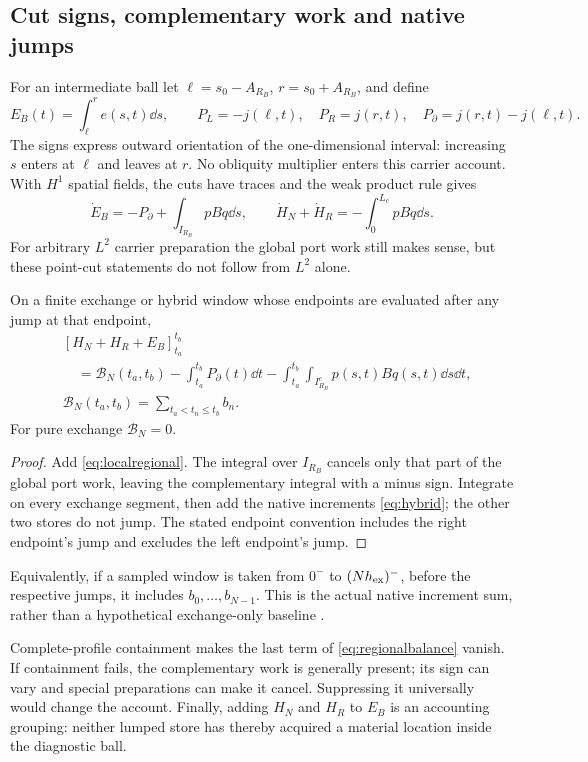 \subsection{Cut signs, complementary work and native jumps}\label{sec:regional}
For an intermediate ball let $\ell=s_0-A_{R_B}$, $r=s_0+A_{R_B}$, and define
\begin{equation}\label{eq:regionaldefinitions}
 E_B(t)=\int_\ell^r e(s,t)\dd s,\qquad
 P_L=-j(\ell,t),\quad P_R=j(r,t),\quad P_\partial=j(r,t)-j(\ell,t).
\end{equation}
The signs express outward orientation of the one-dimensional interval: increasing $s$ enters at $\ell$ and leaves at $r$. No obliquity multiplier enters this carrier account. With $H^1$ spatial fields, the cuts have traces and the weak product rule gives
\begin{equation}\label{eq:localregional}
 \dot E_B=-P_\partial+\int_{I_{R_B}}pBq\dd s,\qquad
 \dot H_N+\dot H_R=-\int_0^{L_c}pBq\dd s.
\end{equation}
For arbitrary $L^2$ carrier preparation the global port work still makes sense, but these point-cut statements do not follow from $L^2$ alone.

\begin{proposition}\label{prop:regional}
On a finite exchange or hybrid window whose endpoints are evaluated after any jump at that endpoint,
\begin{equation}\label{eq:regionalbalance}
 \begin{aligned}
 &[H_N+H_R+E_B]_{t_a}^{t_b}\\
 &\quad=\mathcal B_N(t_a,t_b)
 -\int_{t_a}^{t_b}P_\partial(t)\dd t
 -\int_{t_a}^{t_b}\int_{I_{R_B}^{c}}p(s,t)Bq(s,t)\dd s\dd t,\\
 &\mathcal B_N(t_a,t_b)=\sum_{t_a<t_n\le t_b}b_n.
 \end{aligned}
\end{equation}
For pure exchange $\mathcal B_N=0$.
\end{proposition}
\begin{proof}
Add \eqref{eq:localregional}. The integral over $I_{R_B}$ cancels only that part of the global port work, leaving the complementary integral with a minus sign. Integrate on every exchange segment, then add the native increments \eqref{eq:hybrid}; the other two stores do not jump. The stated endpoint convention includes the right endpoint's jump and excludes the left endpoint's jump.
\end{proof}

Equivalently, if a sampled window is taken from $0^-$ to $(Nh_{\rm ex})^-$, before the respective jumps, it includes $b_0,\ldots,b_{N-1}$. This is the actual native increment sum, rather than a hypothetical exchange-only baseline \cite{RX,F}.

Complete-profile containment makes the last term of \eqref{eq:regionalbalance} vanish. If containment fails, the complementary work is generally present; its sign can vary and special preparations can make it cancel. Suppressing it universally would change the account. Finally, adding $H_N$ and $H_R$ to $E_B$ is an accounting grouping: neither lumped store has thereby acquired a material location inside the diagnostic ball.
